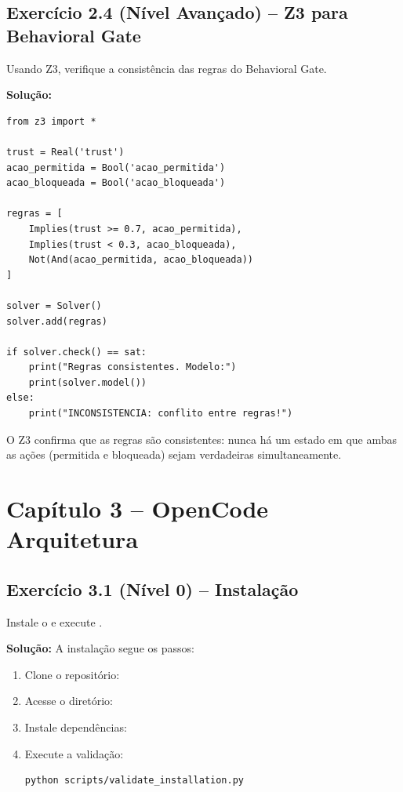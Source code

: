 \subsection*{Exercício 2.4 (Nível Avançado) -- Z3 para Behavioral Gate}
Usando Z3, verifique a consistência das regras do Behavioral Gate.

\textbf{Solução:}
\begin{lstlisting}[style=pythonstyle]
from z3 import *

trust = Real('trust')
acao_permitida = Bool('acao_permitida')
acao_bloqueada = Bool('acao_bloqueada')

regras = [
    Implies(trust >= 0.7, acao_permitida),
    Implies(trust < 0.3, acao_bloqueada),
    Not(And(acao_permitida, acao_bloqueada))
]

solver = Solver()
solver.add(regras)

if solver.check() == sat:
    print("Regras consistentes. Modelo:")
    print(solver.model())
else:
    print("INCONSISTENCIA: conflito entre regras!")
\end{lstlisting}

O Z3 confirma que as regras são consistentes: nunca há um estado em que
ambas as ações (permitida e bloqueada) sejam verdadeiras simultaneamente.

\section*{Capítulo 3 -- OpenCode Arquitetura}

\subsection*{Exercício 3.1 (Nível 0) -- Instalação}
Instale o \opencodeeco{} e execute .

\textbf{Solução:} A instalação segue os passos:

\begin{enumerate}
\item Clone o repositório: 
\item Acesse o diretório: 
\item Instale dependências: 
\item Execute a validação:
\begin{lstlisting}[style=pythonstyle]
python scripts/validate_installation.py
\end{lstlisting}
\end{enumerate}

